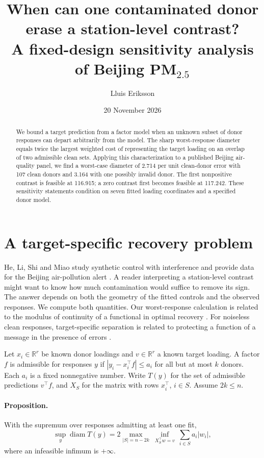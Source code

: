 \documentclass[11pt]{article}
\title{When can one contaminated donor erase a station-level contrast?\\A fixed-design sensitivity analysis of Beijing PM$_{2.5}$}
\author{Lluis Eriksson}
\date{20 November 2026}
\begin{document}
\maketitle
\begin{abstract}
We bound a target prediction from a factor model when an unknown subset of donor responses can depart arbitrarily from the model. The sharp worst-response diameter equals twice the largest weighted cost of representing the target loading on an overlap of two admissible clean sets. Applying this characterization to a published Beijing air-quality panel, we find a worst-case diameter of 2.714 per unit clean-donor error with 107 clean donors and 3.164 with one possibly invalid donor. The first nonpositive contrast is feasible at 116.915; a zero contrast first becomes feasible at 117.242. These sensitivity statements condition on seven fitted loading coordinates and a specified donor model.
\end{abstract}
\section{A target-specific recovery problem}
He, Li, Shi and Miao study synthetic control with interference and provide data for the Beijing air-pollution alert \cite{he,data}. A reader interpreting a station-level contrast might want to know how much contamination would suffice to remove its sign. The answer depends on both the geometry of the fitted controls and the observed responses. We compute both quantities. Our worst-response calculation is related to the modulus of continuity of a functional in optimal recovery \cite{donoho}. For noiseless clean responses, target-specific separation is related to protecting a function of a message in the presence of errors \cite{lenz}.

Let $x_i\in\mathbb R^r$ be known donor loadings and $v\in\mathbb R^r$ a known target loading. A factor $f$ is admissible for responses $y$ if $|y_i-x_i^\top f|\le a_i$ for all but at most $k$ donors. Each $a_i$ is a fixed nonnegative number. Write $T(y)$ for the set of admissible predictions $v^\top f$, and $X_S$ for the matrix with rows $x_i^\top$, $i\in S$. Assume $2k\le n$.

\paragraph{Proposition.} With the supremum over responses admitting at least one fit,
\[
 \sup_y\operatorname{diam} T(y)
 =2\max_{|S|=n-2k}\ \inf_{X_S^\top w=v}\ \sum_{i\in S}a_i|w_i|,
\]
where an infeasible infimum is $+\infty$.
\end{document}
